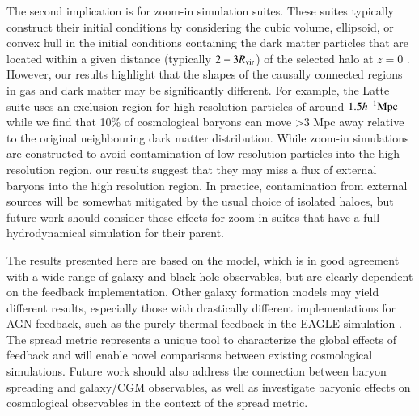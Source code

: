 The second implication is for zoom-in simulation suites. These suites
typically construct their initial conditions by considering the cubic volume,
ellipsoid, or convex hull in the initial conditions containing the dark
matter particles that are located within a given distance (typically
$2-3R_{\rm vir}$) of the selected halo at $z=0$ \citep[see e.g.][]{Onorbe2014}.
However, our results highlight that the shapes of the
causally connected regions in gas and dark matter may be significantly
different. For example, the Latte \citep{Wetzel2016} suite uses an exclusion
region for high resolution particles of around $1.5 h^{-1}{\rm Mpc}{}$ while we find
that 10\% of cosmological baryons can move >3 Mpc away relative to the
original neighbouring dark matter distribution. While zoom-in simulations are
constructed to avoid contamination of low-resolution particles into the
high-resolution region, our results suggest that they may miss a flux of
external baryons into the high resolution region. In practice, contamination
from external sources will be somewhat mitigated by the usual choice of
isolated haloes, but future work should consider these effects for zoom-in
suites that have a full hydrodynamical simulation for their parent.


The results presented here are based on the \simba{} model, which is in good
agreement with a wide range of galaxy \citep{Dave2019} and black hole
\citep{Thomas2019} observables, but are clearly dependent on the feedback
implementation. Other galaxy formation models may yield different results,
especially those with drastically different implementations for AGN feedback,
such as the purely thermal feedback in the EAGLE simulation
\citet{Schaye2015}. The spread metric represents a unique tool to
characterize the global effects of feedback and will enable novel comparisons
between existing cosmological simulations. Future work should also address
the connection between baryon spreading and galaxy/CGM observables, as well
as investigate baryonic effects on cosmological observables
\citep{Schneider2015, Chisari2018} in the context of the spread metric.
